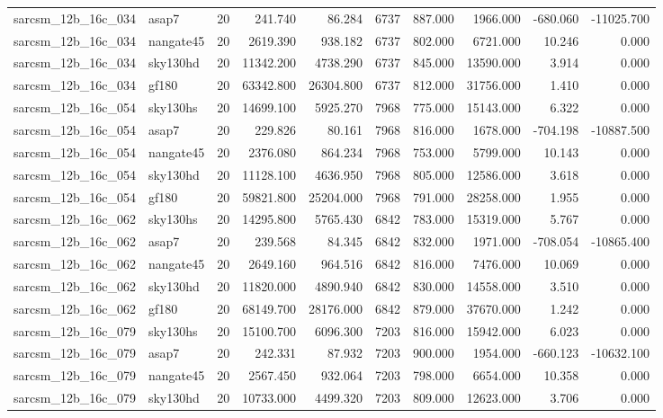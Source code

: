 \begin{tabular}{llrrrrrrrr}
sarcsm\_12b\_16c\_034 & asap7 & 20 & 241.740 & 86.284 & 6737 & 887.000 & 1966.000 & -680.060 & -11025.700 \\
sarcsm\_12b\_16c\_034 & nangate45 & 20 & 2619.390 & 938.182 & 6737 & 802.000 & 6721.000 & 10.246 & 0.000 \\
sarcsm\_12b\_16c\_034 & sky130hd & 20 & 11342.200 & 4738.290 & 6737 & 845.000 & 13590.000 & 3.914 & 0.000 \\
sarcsm\_12b\_16c\_034 & gf180 & 20 & 63342.800 & 26304.800 & 6737 & 812.000 & 31756.000 & 1.410 & 0.000 \\
sarcsm\_12b\_16c\_054 & sky130hs & 20 & 14699.100 & 5925.270 & 7968 & 775.000 & 15143.000 & 6.322 & 0.000 \\
sarcsm\_12b\_16c\_054 & asap7 & 20 & 229.826 & 80.161 & 7968 & 816.000 & 1678.000 & -704.198 & -10887.500 \\
sarcsm\_12b\_16c\_054 & nangate45 & 20 & 2376.080 & 864.234 & 7968 & 753.000 & 5799.000 & 10.143 & 0.000 \\
sarcsm\_12b\_16c\_054 & sky130hd & 20 & 11128.100 & 4636.950 & 7968 & 805.000 & 12586.000 & 3.618 & 0.000 \\
sarcsm\_12b\_16c\_054 & gf180 & 20 & 59821.800 & 25204.000 & 7968 & 791.000 & 28258.000 & 1.955 & 0.000 \\
sarcsm\_12b\_16c\_062 & sky130hs & 20 & 14295.800 & 5765.430 & 6842 & 783.000 & 15319.000 & 5.767 & 0.000 \\
sarcsm\_12b\_16c\_062 & asap7 & 20 & 239.568 & 84.345 & 6842 & 832.000 & 1971.000 & -708.054 & -10865.400 \\
sarcsm\_12b\_16c\_062 & nangate45 & 20 & 2649.160 & 964.516 & 6842 & 816.000 & 7476.000 & 10.069 & 0.000 \\
sarcsm\_12b\_16c\_062 & sky130hd & 20 & 11820.000 & 4890.940 & 6842 & 830.000 & 14558.000 & 3.510 & 0.000 \\
sarcsm\_12b\_16c\_062 & gf180 & 20 & 68149.700 & 28176.000 & 6842 & 879.000 & 37670.000 & 1.242 & 0.000 \\
sarcsm\_12b\_16c\_079 & sky130hs & 20 & 15100.700 & 6096.300 & 7203 & 816.000 & 15942.000 & 6.023 & 0.000 \\
sarcsm\_12b\_16c\_079 & asap7 & 20 & 242.331 & 87.932 & 7203 & 900.000 & 1954.000 & -660.123 & -10632.100 \\
sarcsm\_12b\_16c\_079 & nangate45 & 20 & 2567.450 & 932.064 & 7203 & 798.000 & 6654.000 & 10.358 & 0.000 \\
sarcsm\_12b\_16c\_079 & sky130hd & 20 & 10733.000 & 4499.320 & 7203 & 809.000 & 12623.000 & 3.706 & 0.000 \\

\end{tabular}
